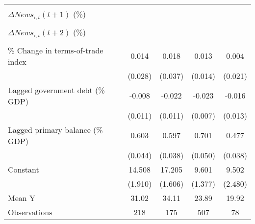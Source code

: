 {\begin{tabular}{l*{4}{c}}
                    &                     &                     &                     &                     \\
\addlinespace
$ \Delta News_{i,t}(t+1)$ (\%)&                     &                     &                     &                     \\
                    &                     &                     &                     &                     \\
\addlinespace
$ \Delta News_{i,t}(t+2)$ (\%)&                     &                     &                     &                     \\
                    &                     &                     &                     &                     \\
\addlinespace
\% Change in terms-of-trade index&       0.014         &       0.018         &       0.013         &       0.004         \\
                    &     (0.028)         &     (0.037)         &     (0.014)         &     (0.021)         \\
\addlinespace
Lagged government debt (\% GDP)&      -0.008         &      -0.022\sym{*}  &      -0.023\sym{***}&      -0.016         \\
                    &     (0.011)         &     (0.011)         &     (0.007)         &     (0.013)         \\
\addlinespace
Lagged primary balance (\% GDP)&       0.603\sym{***}&       0.597\sym{***}&       0.701\sym{***}&       0.477\sym{***}\\
                    &     (0.044)         &     (0.038)         &     (0.050)         &     (0.038)         \\
\addlinespace
Constant            &      14.508\sym{***}&      17.205\sym{***}&       9.601\sym{***}&       9.502\sym{***}\\
                    &     (1.910)         &     (1.606)         &     (1.377)         &     (2.480)         \\
\midrule
Mean Y              &       31.02         &       34.11         &       23.89         &       19.92         \\
Observations        &         218         &         175         &         507         &          78         \\
\bottomrule
\end{tabular}
}
